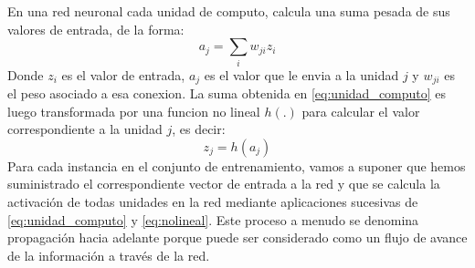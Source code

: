 \documentclass[a4paper,11pt,spanish]{book}
\begin{document}
	En una red neuronal cada unidad de computo, calcula una suma pesada de sus valores de entrada, de la forma:
	\begin{equation} \label{eq:unidad_computo}
	  a_j = \sum_{i} w_{ji} z_i
	\end{equation}
	Donde $z_i$ es el valor de entrada, $a_j$ es el valor que le envia a la unidad $j$ y $w_{ji}$ es el peso asociado a esa conexion.
	La suma obtenida en \eqref{eq:unidad_computo} es luego transformada por una funcion no lineal $h(.)$ para calcular el valor correspondiente a la unidad $j$, es decir:
	\begin{equation}\label{eq:nolineal}
	  z_j = h(a_j)
	\end{equation}
	Para cada instancia en el conjunto de entrenamiento, vamos a suponer que hemos suministrado el correspondiente vector de entrada a la red y que se calcula la activación
	de todas unidades en la red mediante aplicaciones sucesivas de \eqref{eq:unidad_computo} y \eqref{eq:nolineal}. Este proceso a menudo se denomina
	propagación hacia adelante porque puede ser considerado como un flujo de avance de la información a través de la red.
	
\end{document}
